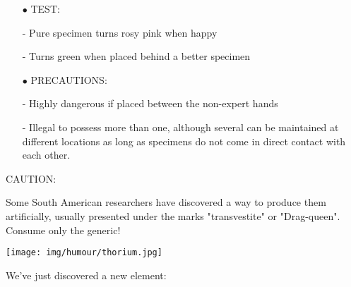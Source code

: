 \begin{itemize}
	\item[$\bullet$] TEST: 

- Pure specimen turns rosy pink when happy

- Turns green when placed behind a better specimen

	\item[$\bullet$] PRECAUTIONS:

- Highly dangerous if placed between the non-expert hands

- Illegal to possess more than one, although several can be maintained at different locations as long as specimens do not come in direct contact with each other.

\end{itemize}

CAUTION: 

Some South American researchers have discovered a way to produce them artificially, usually presented under the marks "transvestite" or "Drag-queen". Consume only the generic!
	\begin{center}\underline{\hspace{5 cm}}\end{center}

	\begin{center}
	\texttt{[image: img/humour/thorium.jpg]}
	\end{center}
	
	\begin{center}\underline{\hspace{5 cm}}\end{center}

We've just discovered a new element:

